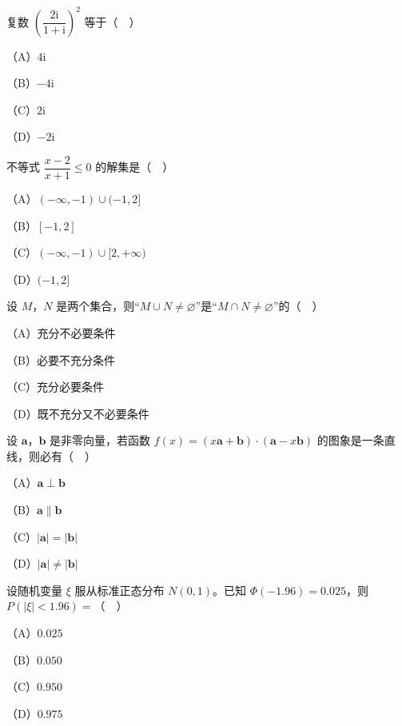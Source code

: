 


\begin{question}
复数 $\left(\dfrac{2\mathrm i}{1+\mathrm i}\right)^2$ 等于（　）

（A）$4\mathrm i$

（B）$-4\mathrm i$

（C）$2\mathrm i$

（D）$-2\mathrm i$

\end{question}
\begin{question}
不等式 $\dfrac{x-2}{x+1}\leqslant0$ 的解集是（　）

（A）$(-\infty,-1)\cup(-1,2]$

（B）$[-1,2]$

（C）$(-\infty,-1)\cup[2,+\infty)$

（D）$(-1,2]$

\end{question}
\begin{question}
设 $M$，$N$ 是两个集合，则“$M\cup N\neq\varnothing$”是“$M\cap N\neq\varnothing$”的（　）

（A）充分不必要条件

（B）必要不充分条件

（C）充分必要条件

（D）既不充分又不必要条件

\end{question}
\begin{question}
设 $\boldsymbol a$，$\boldsymbol b$ 是非零向量，若函数 $f(x)=(x\boldsymbol a+\boldsymbol b)\cdot(\boldsymbol a-x\boldsymbol b)$ 的图象是一条直线，则必有（　）

（A）$\boldsymbol a\perp\boldsymbol b$

（B）$\boldsymbol a\parallel\boldsymbol b$

（C）$|\boldsymbol a|=|\boldsymbol b|$

（D）$|\boldsymbol a|\neq|\boldsymbol b|$

\end{question}
\begin{question}
设随机变量 $\xi$ 服从标准正态分布 $N(0,1)$。已知 $\Phi(-1.96)=0.025$，则 $P(|\xi|<1.96)=$（　）

（A）$0.025$

（B）$0.050$

（C）$0.950$

（D）$0.975$

\end{question}
